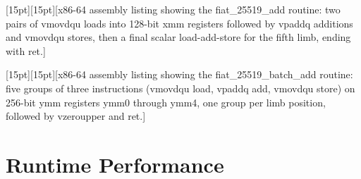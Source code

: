 %
[15pt][15pt][x86-64 assembly listing showing the fiat_25519_add routine: two pairs of vmovdqu loads into 128-bit xmm registers followed by vpaddq additions and vmovdqu stores, then a final scalar load-add-store for the fifth limb, ending with ret.]



[15pt][15pt][x86-64 assembly listing showing the fiat_25519_batch_add routine: five groups of three instructions (vmovdqu load, vpaddq add, vmovdqu store) on 256-bit ymm registers ymm0 through ymm4, one group per limb position, followed by vzeroupper and ret.]

\section{Runtime Performance}
\label{sec:runtime-perf}

